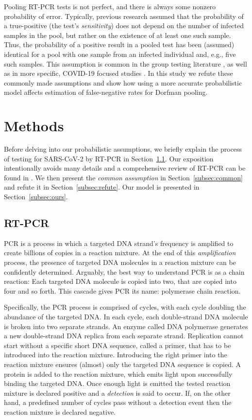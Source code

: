 \documentclass{article}
\begin{document}
Pooling RT-PCR tests is not perfect, and there is always some nonzero
probability of error. Typically, previous research assumed that the probability of a true-positive (the test's \emph{sensitivity}) does not depend on the
number of infected samples in the pool, but rather on the existence of
at least one such sample. Thus, the probability of a positive result
in a pooled test has been (assumed) identical for a pool with one sample
from an infected individual and, e.g., five such samples. This
assumption is common in the group testing literature \cite{Kim,
  OptimalDorfmanPool}, as well as in more specific, COVID-19 focused
studies \cite{Simplistic1, Simplistic2}. In this study we refute these
commonly made assumptions and show how using a more accurate probabilistic model affects estimation of
false-negative rates for Dorfman pooling.

\section{Methods}
Before delving into our probabilistic assumptions, we briefly explain
the process of testing for SARS-CoV-2 by RT-PCR in
Section~\ref{subsec:rtpcr}. Our exposition intentionally avoids many
details and a comprehensive review of RT-PCR can be found in
\cite{COVID-RTPCR, PCRBook}. We then present the \emph{common
  assumption} in Section~\ref{subsec:common} and refute it in
Section~\ref{subsec:refute}. Our model is presented in
Section~\ref{subsec:ours}.

\subsection{RT-PCR}\label{subsec:rtpcr}
PCR is a process in which a targeted DNA strand's frequency is
amplified to create billions of copies in a reaction mixture. At the
end of this \emph{amplification} process, the presence of targeted DNA
molecules in a reaction mixture can be confidently
determined. Arguably, the best way to understand PCR is as a chain
reaction: Each targeted DNA molecule is copied into two, that are
copied into four and so forth. This cascade gives PCR its name:
polymerase chain reaction.

Specifically, the PCR process is comprised of cycles, with each cycle
doubling the abundance of the targeted DNA. In each cycle, each
double-strand DNA molecule is broken into two separate strands. An
enzyme called DNA polymerase generates a new double-strand DNA replica
from each separate strand. Replication cannot start without a specific
short DNA sequence, called a primer, that has to be introduced into
the reaction mixture. Introducing the right primer into the reaction
mixture ensures (almost) only the targeted DNA sequence is copied. A
protein is added to the reaction mixture, which emits light upon
successfully binding the targeted DNA. Once enough light is emitted
the tested reaction mixture is declared positive and a
\emph{detection} is said to occur. If, on the other hand, a predefined
number of cycles pass without a detection event then the reaction
mixture is declared negative.
\end{document}
